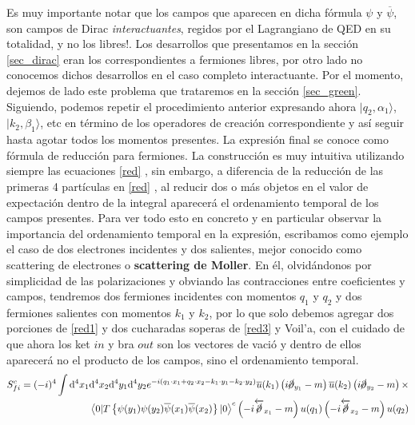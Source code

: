 \documentclass[tickz]{article}
\numberwithin{equation}{section}
\begin{document}
Es muy importante notar que los campos que aparecen en dicha fórmula $\psi$ y $\overline{\psi}$,
son campos de Dirac \textit{interactuantes}, regidos por el Lagrangiano de
QED en su totalidad, y no los libres!. Los desarrollos que presentamos en la sección \ref{sec_dirac} eran los correspondientes a fermiones libres, por otro lado no conocemos dichos desarrollos en el caso completo interactuante. Por el momento, dejemos de lado este problema que trataremos en la sección \ref{sec_green}.\\

Siguiendo, podemos repetir el procedimiento anterior expresando ahora $ |q_2,\alpha_1 \rangle $, $ | k_2,\beta_{1} \rangle $, etc en término de los operadores de creación correspondiente y así seguir hasta
agotar todos los momentos presentes. La expresión final se conoce como fórmula de reducción
para fermiones. La construcción
es muy intuitiva utilizando siempre las ecuaciones \ref{red} , sin embargo,
a diferencia de la reducción de las primeras 4 partículas en \ref{red} , al reducir dos o más objetos en el valor de expectación dentro de la integral aparecerá el ordenamiento temporal de los campos presentes. Para ver todo esto en concreto y en particular observar
la importancia del ordenamiento temporal en la expresión, escribamos
como ejemplo el caso de dos electrones incidentes y dos salientes,
mejor conocido como scattering de electrones o \textbf{scattering de Moller}.
En él, olvidándonos por simplicidad de las polarizaciones y obviando
las contracciones entre coeficientes y campos, tendremos dos fermiones
incidentes con momentos $q_{1}$ y $q_{2}$ y dos fermiones salientes
con momentos $k_{1}$ y $k_{2}$, por lo que solo debemos agregar dos
porciones de \ref{red1}  y dos cucharadas soperas de \ref{red3}  y Voil'a, con el cuidado
de que ahora los ket $ in $ y bra $ out $ son los vectores de vació y dentro
de ellos aparecerá no el producto de los campos, sino el ordenamiento
temporal.
\begin{equation}\label{Moller}
\begin{aligned}
S_{fi}^{c} =(-i)^{4}\int \mathrm{d^4}x_{1}\mathrm{d^4}x_{2}\mathrm{d^4}y_{1}\mathrm{d^4}y_{2}e^{-i\left(q_{1}\cdot x_{1}+q_{2}\cdot x_{2} - k_{1}\cdot y_{1} -k_{2}\cdot y_{2}\right)}\overline{u}(k_{1})\left(i\cancel{\partial}_{y_{1}}-m\right)\overline{u}(k_{2})\left(i\cancel{\partial}_{y_{2}}-m\right) \times\\
\left\langle 0|T\left\{ \psi(y_{1})\psi(y_{2})\overline{\psi}(x_{1})\overline{\psi}(x_{2})\right\} |0\right\rangle ^{c}\left(-i\overleftarrow{\cancel{\partial}}_{x_{1}}-m\right)u(q_{1})\left(-i\overleftarrow{\cancel{\partial}}_{x_{2}}-m\right)u(q_{2})
\end{aligned}
\end{equation}
\end{document}
